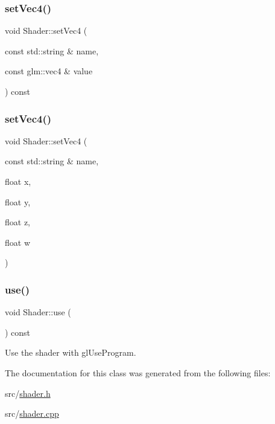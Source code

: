 \mbox{\label{classShader_a79cbe674f6bf1a576a48045dcb924de5}} 
\subsubsection{\texorpdfstring{set\+Vec4()}{setVec4()}\hspace{0.1cm}{\footnotesize\ttfamily [1/2]}}
{\footnotesize\ttfamily void Shader\+::set\+Vec4 (\begin{DoxyParamCaption}\item[{const std\+::string \&}]{name,  }\item[{const glm\+::vec4 \&}]{value }\end{DoxyParamCaption}) const\hspace{0.3cm}{\ttfamily [inline]}}

\mbox{\label{classShader_a913e10fe2501b00746ae6901b97a1730}} 
\subsubsection{\texorpdfstring{set\+Vec4()}{setVec4()}\hspace{0.1cm}{\footnotesize\ttfamily [2/2]}}
{\footnotesize\ttfamily void Shader\+::set\+Vec4 (\begin{DoxyParamCaption}\item[{const std\+::string \&}]{name,  }\item[{float}]{x,  }\item[{float}]{y,  }\item[{float}]{z,  }\item[{float}]{w }\end{DoxyParamCaption})\hspace{0.3cm}{\ttfamily [inline]}}

\mbox{\label{classShader_a3c7896754f0e1fca8bde860cfef63832}} 
\subsubsection{\texorpdfstring{use()}{use()}}
{\footnotesize\ttfamily void Shader\+::use (\begin{DoxyParamCaption}{ }\end{DoxyParamCaption}) const}



Use the shader with gl\+Use\+Program. 



The documentation for this class was generated from the following files\+:\begin{DoxyCompactItemize}
\item 
src/\hyperlink{shader_8h}{shader.\+h}\item 
src/\hyperlink{shader_8cpp}{shader.\+cpp}\end{DoxyCompactItemize}
